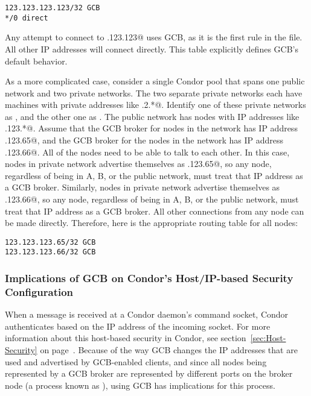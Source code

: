 \begin{verbatim}
123.123.123.123/32 GCB
*/0 direct
\end{verbatim}

Any attempt to connect to .123.123@ uses GCB,
as it is the first rule in the file.
All other IP addresses
will connect directly.
This table explicitly defines GCB's default behavior.


As a more complicated case, consider a single Condor pool that
spans one public network and two private networks.
The two separate private networks each have machines
with private addresses like .2.*@.
Identify one of these private networks as \verb@A@, and the other one
as \verb@B@. 
The public network has nodes with IP addresses like
.123.*@.
Assume that the GCB broker for nodes in the \verb@A@ network 
has IP address
.123.65@,
and the GCB broker for the nodes in the \verb@B@ network
has IP address
.123.66@.
All of the nodes need to be able to talk to each other.
In this case, nodes in private network \verb@A@ advertise
themselves as .123.65@, so any node, regardless of being
in A, B, or the public network, must treat that IP address as a GCB broker.
Similarly, nodes in private network \verb@B@ advertise 
themselves as .123.66@, so any node, regardless of being
in A, B, or the public network, must treat that IP address as a GCB broker.
All other connections from any node can be made directly.
Therefore, here is the appropriate routing table for all nodes:

\begin{verbatim}
123.123.123.65/32 GCB
123.123.123.66/32 GCB
\end{verbatim}


\subsubsection{\label{sec:GCB-host-security-implications}Implications
of GCB on Condor's Host/IP-based Security Configuration} 

When a message is received at a Condor daemon's command socket,
Condor authenticates based on the IP
address of the incoming socket.
For more information about this host-based security in Condor, see
section~\ref{sec:Host-Security} on page~\pageref{sec:Host-Security}.
Because of the way GCB changes the IP addresses that are used and
advertised by GCB-enabled clients, and since all nodes being
represented by a GCB broker are represented by different ports on the
broker node (a process known as ), using GCB has
implications for this process.

